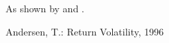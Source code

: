 \documentclass{article}
\begin{document}
As shown by \cite*{Andersen96} and \cite{Andersen96}.
\begin{thebibliography}{}
 Andersen, T.: Return Volatility, 1996
\end{thebibliography}
\end{document}
